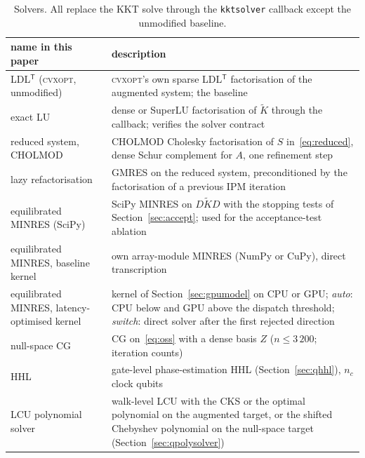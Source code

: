 \documentclass[11pt]{article}
\theoremstyle{definition}
\newcommand{\Kt}{\tilde K}
\newcommand{\T}{^{\mathsf T}}
\begin{document}
\begin{table}[t]\centering\small
\caption{Solvers. All replace the KKT solve through the \texttt{kktsolver} callback except the unmodified baseline.}\label{tab:solvers}
\begin{tabularx}{\textwidth}{p{4.6cm}X}\toprule
name in this paper & description\\\midrule
LDL$\T$ (\textsc{cvxopt}, unmodified) & \textsc{cvxopt}'s own sparse LDL$\T$ factorisation of the augmented system; the baseline\\
exact LU & dense or SuperLU factorisation of $\Kt$ through the callback; verifies the solver contract\\
reduced system, CHOLMOD & CHOLMOD Cholesky factorisation of $S$ in~\eqref{eq:reduced}, dense Schur complement for $A$, one refinement step\\
lazy refactorisation & GMRES on the reduced system, preconditioned by the factorisation of a previous IPM iteration\\
equilibrated MINRES (SciPy) & SciPy MINRES on $D\Kt D$ with the stopping tests of Section~\ref{sec:accept}; used for the acceptance-test ablation\\
equilibrated MINRES, baseline kernel & own array-module MINRES (NumPy or CuPy), direct transcription\\
equilibrated MINRES, latency-optimised kernel & kernel of Section~\ref{sec:gpumodel} on CPU or GPU; \emph{auto}: CPU below and GPU above the dispatch threshold; \emph{switch}: direct solver after the first rejected direction\\
null-space CG & CG on~\eqref{eq:oss} with a dense basis $Z$ ($n\le3\,200$; iteration counts)\\
HHL & gate-level phase-estimation HHL (Section~\ref{sec:qhhl}), $n_c$ clock qubits\\
LCU polynomial solver & walk-level LCU with the CKS or the optimal polynomial on the augmented target, or the shifted Chebyshev polynomial on the null-space target (Section~\ref{sec:qpolysolver})\\\bottomrule
\end{tabularx}
\end{table}
\end{document}
